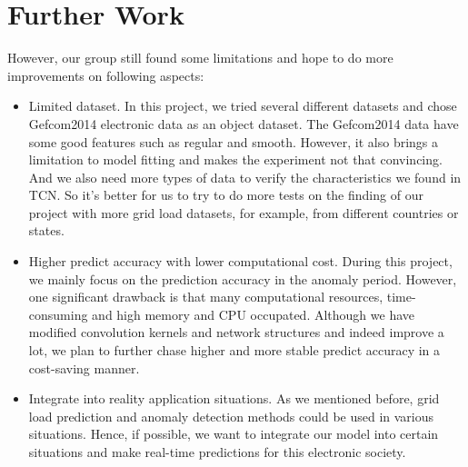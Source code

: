 \section{Further Work}
However, our group still found some limitations and hope to do more improvements on following aspects:
\begin{itemize}
    \item Limited dataset. In this project, we tried several different datasets and chose Gefcom2014 electronic data as an object dataset. The Gefcom2014 data have some good features such as regular and smooth. However, it also brings a limitation to model fitting and makes the experiment not that convincing. And we also need more types of data to verify the characteristics we found in TCN. So it's better for us to try to do more tests on the finding of our project with more grid load datasets, for example, from different countries or states.
    \item Higher predict accuracy with lower computational cost. During this project, we mainly focus on the prediction accuracy in the anomaly period. However,  one significant drawback is that many computational resources, time-consuming and high memory and CPU occupated. Although we have modified convolution kernels and network structures and indeed improve a lot, we plan to further chase higher and more stable predict accuracy in a cost-saving manner. 
    \item Integrate into reality application situations. As we mentioned before, grid load prediction and anomaly detection methods could be used in various situations. Hence, if possible, we want to integrate our model into certain situations and make real-time predictions for this electronic society.
\end{itemize}